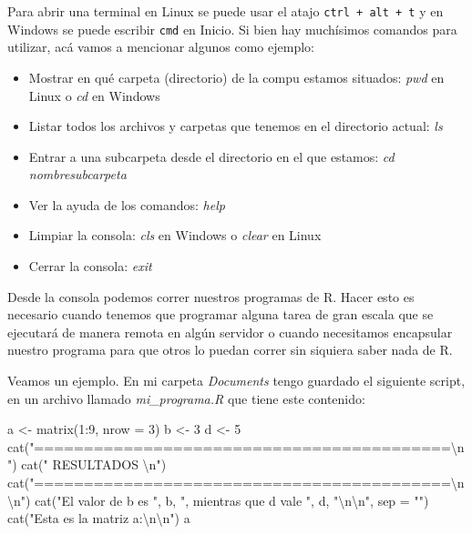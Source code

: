 \documentclass[
]{book}
\newenvironment{Shaded}{\begin{snugshade}}{\end{snugshade}}
\newcommand{\AttributeTok}[1]{\textcolor[rgb]{0.77,0.63,0.00}{#1}}
\newcommand{\DecValTok}[1]{\textcolor[rgb]{0.00,0.00,0.81}{#1}}
\newcommand{\FunctionTok}[1]{\textcolor[rgb]{0.00,0.00,0.00}{#1}}
\newcommand{\NormalTok}[1]{#1}
\newcommand{\OtherTok}[1]{\textcolor[rgb]{0.56,0.35,0.01}{#1}}
\newcommand{\SpecialCharTok}[1]{\textcolor[rgb]{0.00,0.00,0.00}{#1}}
\newcommand{\StringTok}[1]{\textcolor[rgb]{0.31,0.60,0.02}{#1}}
\providecommand{\tightlist}{%
  \setlength{\itemsep}{0pt}\setlength{\parskip}{0pt}}
\begin{document}
Para abrir una terminal en Linux se puede usar el atajo \texttt{ctrl\ +\ alt\ +\ t} y en Windows se puede escribir \texttt{cmd} en Inicio. Si bien hay muchísimos comandos para utilizar, acá vamos a mencionar algunos como ejemplo:

\begin{itemize}
\tightlist
\item
  Mostrar en qué carpeta (directorio) de la compu estamos situados: \emph{pwd} en Linux o \emph{cd} en Windows
\item
  Listar todos los archivos y carpetas que tenemos en el directorio actual: \emph{ls}
\item
  Entrar a una subcarpeta desde el directorio en el que estamos: \emph{cd nombresubcarpeta}
\item
  Ver la ayuda de los comandos: \emph{help}
\item
  Limpiar la consola: \emph{cls} en Windows o \emph{clear} en Linux
\item
  Cerrar la consola: \emph{exit}
\end{itemize}

Desde la consola podemos correr nuestros programas de R. Hacer esto es necesario cuando tenemos que programar alguna tarea de gran escala que se ejecutará de manera remota en algún servidor o cuando necesitamos encapsular nuestro programa para que otros lo puedan correr sin siquiera saber nada de R.

Veamos un ejemplo. En mi carpeta \emph{Documents} tengo guardado el siguiente script, en un archivo llamado \emph{mi\_programa.R} que tiene este contenido:

\begin{Shaded}
\begin{Highlighting}[]
\NormalTok{a }\OtherTok{\textless{}{-}} \FunctionTok{matrix}\NormalTok{(}\DecValTok{1}\SpecialCharTok{:}\DecValTok{9}\NormalTok{, }\AttributeTok{nrow =} \DecValTok{3}\NormalTok{)}
\NormalTok{b }\OtherTok{\textless{}{-}} \DecValTok{3}
\NormalTok{d }\OtherTok{\textless{}{-}} \DecValTok{5}
\FunctionTok{cat}\NormalTok{(}\StringTok{"==========================================}\SpecialCharTok{\textbackslash{}n}\StringTok{"}\NormalTok{)}
\FunctionTok{cat}\NormalTok{(}\StringTok{"                  RESULTADOS              }\SpecialCharTok{\textbackslash{}n}\StringTok{"}\NormalTok{)}
\FunctionTok{cat}\NormalTok{(}\StringTok{"==========================================}\SpecialCharTok{\textbackslash{}n\textbackslash{}n}\StringTok{"}\NormalTok{)}
\FunctionTok{cat}\NormalTok{(}\StringTok{"El valor de b es "}\NormalTok{, b, }\StringTok{", mientras que d vale "}\NormalTok{, d, }\StringTok{"}\SpecialCharTok{\textbackslash{}n\textbackslash{}n}\StringTok{"}\NormalTok{, }\AttributeTok{sep =} \StringTok{""}\NormalTok{)}
\FunctionTok{cat}\NormalTok{(}\StringTok{"Esta es la matriz a:}\SpecialCharTok{\textbackslash{}n\textbackslash{}n}\StringTok{"}\NormalTok{)}
\NormalTok{a}
\end{Highlighting}
\end{Shaded}
\end{document}
